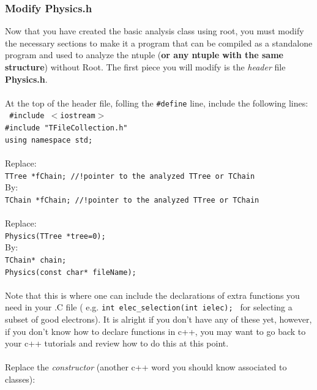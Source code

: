 \documentclass[12pt]{article}
\begin{document}
\subsubsection{Modify Physics.h} 
Now that you have created the basic analysis class using root, you must modify the necessary sections to make it a program that can be compiled as a standalone program and used to analyze the ntuple (\textbf{or any ntuple with the same structure}) without Root.  The first piece you will modify is the \textit{header} file \textbf{Physics.h}.  \\
\\
At the top of the header file, folling the \texttt{\#define} line, include the following lines:\\
\texttt{
\#include $<$iostream$>$\\
\#include "TFileCollection.h"\\
using namespace std;\\
}
\\
Replace:\\
\texttt{TTree          *fChain;   //!pointer to the analyzed TTree or TChain}\\
By:\\
\texttt{TChain         *fChain;  //!pointer to the analyzed TTree or TChain}\\\\
Replace:\\
\texttt{Physics(TTree *tree=0);}\\
By:\\
\texttt{TChain* chain;}\\
\texttt{Physics(const char* fileName);}\\\\
Note that this is where one can include the declarations of extra functions you need in your .C file ( e.g. \texttt{int elec\_selection(int ielec); } for selecting a subset of good electrons).  It is alright if you don't have any of these yet, however, if you don't know how to declare functions in c++, you may want to go back to your c++ tutorials and review how to do this at this point.\\
\\
Replace the \textit{constructor} (another c++ word you should know associated to classes):\\
\end{document}
